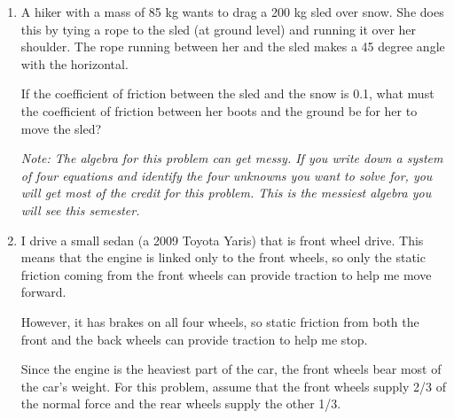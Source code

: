 \documentclass[12pt]{article}
\begin{document}
\begin{enumerate}
\bigskip

\item{A hiker with a mass of 85 kg wants to drag a 200 kg sled over snow. She does this by tying a rope to the sled (at ground level) and running it over her shoulder. The rope running between her and the sled makes a 45 degree angle with the horizontal.

  If the coefficient of friction between the sled and the snow is 0.1, what must the coefficient of friction between her boots and the ground be for her to move the sled?
  
  
  
   {\it Note: The algebra for this problem can get messy. If you write down a system of four equations and identify the four unknowns you want to solve for, you will get most of the credit for this problem. This is the messiest algebra you will see this semester.}

}

\bigskip



\item I drive a small sedan (a 2009 Toyota Yaris) that is front wheel drive. This means that the engine is linked only to the front wheels, so only the static friction coming from the front wheels can provide traction to help me move forward.

However, it has brakes on all four wheels, so static friction from both the front and the back wheels can provide traction to help me stop.

Since the engine is the heaviest part of the car, the front wheels bear most of the car's weight. For this problem, assume
that the front wheels supply 2/3 of the normal force and the rear wheels supply the other 1/3.


\end{enumerate}
\end{document}
